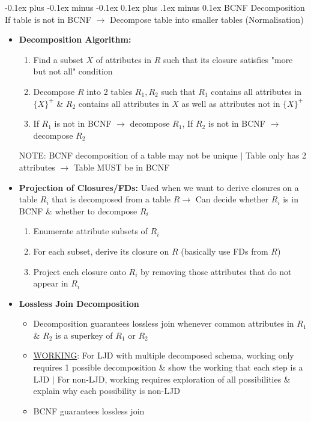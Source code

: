 \documentclass[landscape]{article}
\makeatletter
\renewcommand{\subsection}{\@startsection{subsection}{2}{0mm}%
  {-0.1ex plus -0.1ex minus -0.1ex}%
  {0.1ex plus .1ex minus 0.1ex}%
{\normalfont\scriptsize\bfseries}}
\makeatother
\begin{document}
\begin{multicols*}{5}
    \subsection{BCNF Decomposition}
    If table is not in BCNF $\rightarrow$ Decompose table into smaller tables (Normalisation)
    \begin{itemize}
      \item \textbf{Decomposition Algorithm:}
      \begin{enumerate}
        \item Find a subset $X$ of attributes in $R$ such that its closure satisfies "more but not all" condition
        \item Decompose $R$ into 2 tables $R_1, R_2$ such that $R_1$ contains all attributes in $\{X\}^{+}$ \& $R_2$ contains all attributes in $X$ as well as attributes not in $\{X\}^{+}$
        \item If $R_1$ is not in BCNF $\rightarrow$ decompose $R_1$, If $R_2$ is not in BCNF $\rightarrow$ decompose $R_2$ 
      \end{enumerate}
    NOTE: BCNF decomposition of a table may not be unique $\vert$ Table only has 2 attributes $\rightarrow$ Table MUST be in BCNF
    \item \textbf{Projection of Closures/FDs:} Used when we want to derive closures on a table $R_i$ that is decomposed from a table $R \rightarrow$ Can decide whether $R_i$ is in BCNF \& whether to decompose $R_i$
    \begin{enumerate}
      \item Enumerate attribute subsets of $R_i$
      \item For each subset, derive its closure on $R$ (basically use FDs from $R$)
      \item Project each closure onto $R_i$ by removing those attributes that do not appear in $R_i$
    \end{enumerate}
    \item \textbf{Lossless Join Decomposition}
    \begin{itemize}
      \item Decomposition guarantees lossless join whenever common attributes in $R_1$ \& $R_2$ is a superkey of  $R_1$ or $R_2$
      \item \underline{WORKING}: For LJD with multiple decomposed schema, working only requires 1 possible decomposition \& show the working that each step is a LJD $\vert$ For non-LJD, working requires exploration of all possibilities \& explain why each possibility is non-LJD 
      \item BCNF guarantees lossless join
    \end{itemize}
    \end{itemize}
  \end{multicols*}
\end{document}
